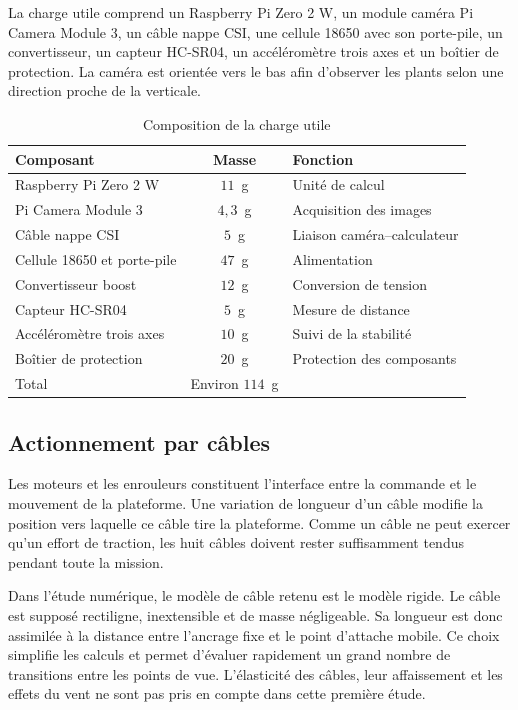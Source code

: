 La charge utile comprend un Raspberry Pi Zero 2 W, un module caméra Pi Camera Module 3, un câble nappe CSI, une cellule 18650 avec son porte-pile, un convertisseur, un capteur HC-SR04, un accéléromètre trois axes et un boîtier de protection. La caméra est orientée vers le bas afin d'observer les plants selon une direction proche de la verticale.

\begin{table}[H]
\centering
\caption{Composition de la charge utile}
\label{tab:charge_nouvelle}
\begin{tabular}{|p{6.5cm}|c|p{5.0cm}|}
\hline
\textbf{Composant} & \textbf{Masse} & \textbf{Fonction} \\
\hline
Raspberry Pi Zero 2 W & $11$~g & Unité de calcul \\
\hline
Pi Camera Module 3 & $4{,}3$~g & Acquisition des images \\
\hline
Câble nappe CSI & $5$~g & Liaison caméra--calculateur \\
\hline
Cellule 18650 et porte-pile & $47$~g & Alimentation \\
\hline
Convertisseur boost & $12$~g & Conversion de tension \\
\hline
Capteur HC-SR04 & $5$~g & Mesure de distance \\
\hline
Accéléromètre trois axes & $10$~g & Suivi de la stabilité \\
\hline
Boîtier de protection & $20$~g & Protection des composants \\
\hline
Total & Environ $114$~g & \\
\hline
\end{tabular}
\end{table}

\subsection{Actionnement par câbles}

Les moteurs et les enrouleurs constituent l'interface entre la commande et le mouvement de la plateforme. Une variation de longueur d'un câble modifie la position vers laquelle ce câble tire la plateforme. Comme un câble ne peut exercer qu'un effort de traction, les huit câbles doivent rester suffisamment tendus pendant toute la mission.

Dans l'étude numérique, le modèle de câble retenu est le modèle rigide. Le câble est supposé rectiligne, inextensible et de masse négligeable. Sa longueur est donc assimilée à la distance entre l'ancrage fixe et le point d'attache mobile. Ce choix simplifie les calculs et permet d'évaluer rapidement un grand nombre de transitions entre les points de vue. L'élasticité des câbles, leur affaissement et les effets du vent ne sont pas pris en compte dans cette première étude.

